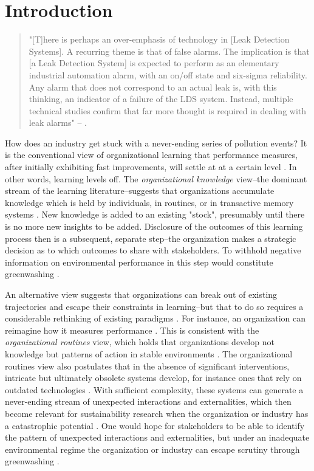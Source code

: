 \section{Introduction}

\begin{singlespace} 
	\begin{quote}
		"[T]here is perhaps an over-emphasis of technology in [Leak Detection Systems]. A recurring theme is that of false alarms. The implication is that [a Leak Detection System] is expected to perform as an elementary industrial automation alarm, with an on/off state and six-sigma reliability. Any alarm that does not correspond to an actual leak is, with this thinking, an indicator of a failure of the LDS system. Instead, multiple technical studies confirm that far more thought is required in dealing with leak alarms" -- \citet[p. 2-3]{Shaw2012}.
	\end{quote}
\end{singlespace}

How does an industry get stuck with a never-ending series of pollution events? It is the conventional view of organizational learning that performance measures, after initially exhibiting fast improvements, will settle at at a certain level \citep{Argote2013-1}. In other words, learning levels off. The \textit{organizational knowledge} view--the dominant stream of the learning literature--suggests that organizations accumulate knowledge which is held by individuals, in routines, or in transactive memory systems \citep{Bingham2011, Argote2011}. New knowledge is added to an existing "stock", presumably until there is no more new insights to be added. Disclosure of the outcomes of this learning process then is a subsequent, separate step--the organization makes a strategic decision as to which outcomes to share with stakeholders. To withhold negative information on environmental performance in this step would constitute greenwashing \citep{Lyon2011}.

An alternative view suggests that organizations can break out of existing trajectories and escape their constraints in learning--but that to do so requires a considerable rethinking of existing paradigms \citep{March2010}. For instance, an organization can reimagine how it measures performance \citep{Argyris1978}. This is consistent with the \textit{organizational routines} view, which holds that organizations develop not knowledge but patterns of action in stable environments \citep{Bingham2011}. The organizational routines view also postulates that in the absence of significant interventions, intricate but ultimately obsolete systems develop, for instance ones that rely on outdated technologies \citep{March1991}. With sufficient complexity, these systems can generate a never-ending stream of unexpected interactions and externalities, which then become relevant for sustainability research when the organization or industry has a catastrophic potential \citep{Perrow1984, Beck1992}. One would hope for stakeholders to be able to identify the pattern of unexpected interactions and externalities, but under an inadequate environmental regime the organization or industry can escape scrutiny through greenwashing \citep{Lyon2015}.

